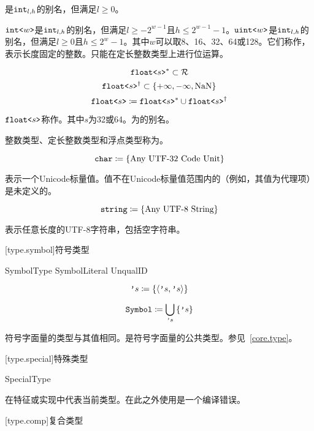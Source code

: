 是$\texttt{int}_{l,h}$的别名，但满足$l\ge0$。

\pnum
$\texttt{int<}w\texttt{>}$是$\texttt{int}_{l,h}$的别名，但满足$l\ge-2^{w-1}$且$h\le2^{w-1}-1$。$\texttt{uint<}w\texttt{>}$是$\texttt{int}_{l,h}$的别名，但满足$l\ge0$且$h\le2^w-1$。其中$w$可以取8、16、32、64或128。它们称作，表示长度固定的整数。只能在定长整数类型上进行位运算。

$$ \texttt{float<}s\texttt{>}^\ast \subset \mathcal{R} $$
$$ \texttt{float<}s\texttt{>}^\dagger \subset \{ +\infty, -\infty, \mathrm{NaN} \} $$
$$ \texttt{float<}s\texttt{>} \coloneqq \texttt{float<}s\texttt{>}^\ast \cup \texttt{float<}s\texttt{>}^\dagger $$

\pnum
$\texttt{float<}s\texttt{>}$称作。其中$s$为32或64。为的别名。

\pnum
整数类型、定长整数类型和浮点类型称为。

$$\texttt{char} \coloneqq \left\{ \textnormal{Any UTF-32 Code Unit} \right\}$$

\pnum
{}表示一个Unicode标量值。值不在Unicode标量值范围内的（例如，其值为代理项）是未定义的。

$$\texttt{string} \coloneqq \left\{ \textnormal{Any UTF-8 String} \right\} $$

\pnum
{}表示任意长度的UTF-8字符串，包括空字符串。

[type.symbol]{符号类型}

\begin{bnf}{SymbolType}
    SymbolLiteral \br
     UnqualID \terminal{)}
\end{bnf}

$$ \texttt{'}s \coloneqq \left\{ \langle \texttt{'}s, \texttt{'}s \rangle \right\} $$

$$ \texttt{Symbol} \coloneqq \bigcup_{\texttt{'}s} \left\{  \texttt{'}s \right\} $$

\pnum
符号字面量的类型与其值相同。是符号字面量的公共类型。参见~\ref{core.type}。

[type.special]{特殊类型}

\begin{bnf}{SpecialType}
\end{bnf}

\pnum
{}在特征或实现中代表当前类型。在此之外使用是一个编译错误。

[type.comp]{复合类型}

